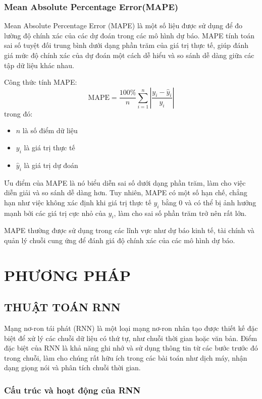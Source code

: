 \documentclass{article}
\begin{document}
\begin{multicols}{2}
 

\subsubsection{Mean Absolute Percentage Error(MAPE)}

Mean Absolute Percentage Error (MAPE) là một số liệu được sử dụng để đo lường độ chính xác của các dự đoán trong các mô hình dự báo. MAPE tính toán sai số tuyệt đối trung bình dưới dạng phần trăm của giá trị thực tế, giúp đánh giá mức độ chính xác của dự đoán một cách dễ hiểu và so sánh dễ dàng giữa các tập dữ liệu khác nhau.

Công thức tính MAPE:
\[
\text{MAPE} = \frac{100\%}{n} \sum_{i=1}^{n} \left| \frac{y_i - \hat{y}_i}{y_i} \right|
\]
trong đó:
\begin{itemize}
    \item $n$ là số điểm dữ liệu
    \item $y_i$ là giá trị thực tế
    \item $\hat{y}_i$ là giá trị dự đoán
\end{itemize}

Ưu điểm của MAPE là nó biểu diễn sai số dưới dạng phần trăm, làm cho việc diễn giải và so sánh dễ dàng hơn. Tuy nhiên, MAPE có một số hạn chế, chẳng hạn như việc không xác định khi giá trị thực tế $y_i$ bằng 0 và có thể bị ảnh hưởng mạnh bởi các giá trị cực nhỏ của $y_i$, làm cho sai số phần trăm trở nên rất lớn.

MAPE thường được sử dụng trong các lĩnh vực như dự báo kinh tế, tài chính và quản lý chuỗi cung ứng để đánh giá độ chính xác của các mô hình dự báo.
\section{PHƯƠNG PHÁP}

\subsection{THUẬT TOÁN RNN}

 Mạng nơ-ron tái phát (RNN) là một loại mạng nơ-ron nhân tạo được thiết kế đặc biệt để xử lý các chuỗi dữ liệu có thứ tự, như chuỗi thời gian hoặc văn bản. Điểm đặc biệt của RNN là khả năng ghi nhớ và sử dụng thông tin từ các bước trước đó trong chuỗi, làm cho chúng rất hữu ích trong các bài toán như dịch máy, nhận dạng giọng nói và phân tích chuỗi thời gian.

\subsubsection{Cấu trúc và hoạt động của RNN}


\end{multicols}
\end{document}
